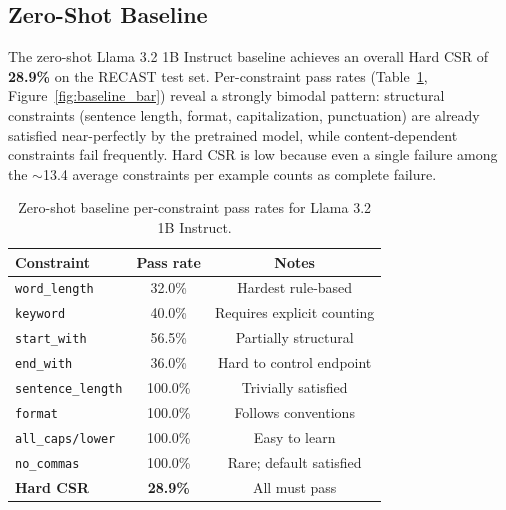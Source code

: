 \documentclass[10pt]{article}
\begin{document}
\subsection{Zero-Shot Baseline}

The zero-shot Llama 3.2 1B Instruct baseline achieves an overall Hard CSR
of \textbf{28.9\%} on the RECAST test set. Per-constraint pass rates
(Table~\ref{tab:baseline}, Figure~\ref{fig:baseline_bar}) reveal a
strongly bimodal pattern: structural constraints (sentence length, format,
capitalization, punctuation) are already satisfied near-perfectly by the
pretrained model, while content-dependent constraints fail frequently.
Hard CSR is low because even a single failure among the $\sim$13.4 average
constraints per example counts as complete failure.

\begin{table}[H]
\centering
\caption{Zero-shot baseline per-constraint pass rates for Llama 3.2 1B
Instruct.}
\label{tab:baseline}
\small
\begin{tabular}{lcc}
\toprule
\textbf{Constraint} & \textbf{Pass rate} & \textbf{Notes} \\
\midrule
\texttt{word\_length}      & 32.0\% & Hardest rule-based \\
\texttt{keyword}           & 40.0\% & Requires explicit counting \\
\texttt{start\_with}       & 56.5\% & Partially structural \\
\texttt{end\_with}         & 36.0\% & Hard to control endpoint \\
\texttt{sentence\_length}  & 100.0\% & Trivially satisfied \\
\texttt{format}            & 100.0\% & Follows conventions \\
\texttt{all\_caps/lower}   & 100.0\% & Easy to learn \\
\texttt{no\_commas}        & 100.0\% & Rare; default satisfied \\
\midrule
\textbf{Hard CSR}          & \textbf{28.9\%} & All must pass \\
\bottomrule
\end{tabular}
\end{table}
\end{document}
